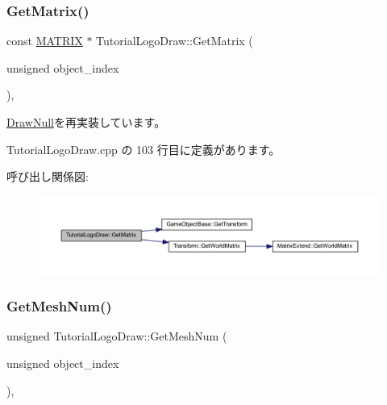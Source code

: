 \subsubsection{\texorpdfstring{Get\+Matrix()}{GetMatrix()}}
{\footnotesize\ttfamily const \mbox{\hyperlink{_vector3_d_8h_a032295cd9fb1b711757c90667278e744}{M\+A\+T\+R\+IX}} $\ast$ Tutorial\+Logo\+Draw\+::\+Get\+Matrix (\begin{DoxyParamCaption}\item[{unsigned}]{object\+\_\+index }\end{DoxyParamCaption})\hspace{0.3cm}{\ttfamily [override]}, {\ttfamily [virtual]}}



\mbox{\hyperlink{class_draw_null_adede079e9c11a756090740b20bb43022}{Draw\+Null}}を再実装しています。



 Tutorial\+Logo\+Draw.\+cpp の 103 行目に定義があります。

呼び出し関係図\+:\nopagebreak
\begin{figure}[H]
\begin{center}
\leavevmode
\includegraphics[width=350pt]{class_tutorial_logo_draw_ab700e592d00574dff6ee342138343d7b_cgraph}
\end{center}
\end{figure}
\mbox{\label{class_tutorial_logo_draw_a19de254c5460e3728d7c79243fd65e6f}} 
\subsubsection{\texorpdfstring{Get\+Mesh\+Num()}{GetMeshNum()}}
{\footnotesize\ttfamily unsigned Tutorial\+Logo\+Draw\+::\+Get\+Mesh\+Num (\begin{DoxyParamCaption}\item[{unsigned}]{object\+\_\+index }\end{DoxyParamCaption})\hspace{0.3cm}{\ttfamily [override]}, {\ttfamily [virtual]}}



